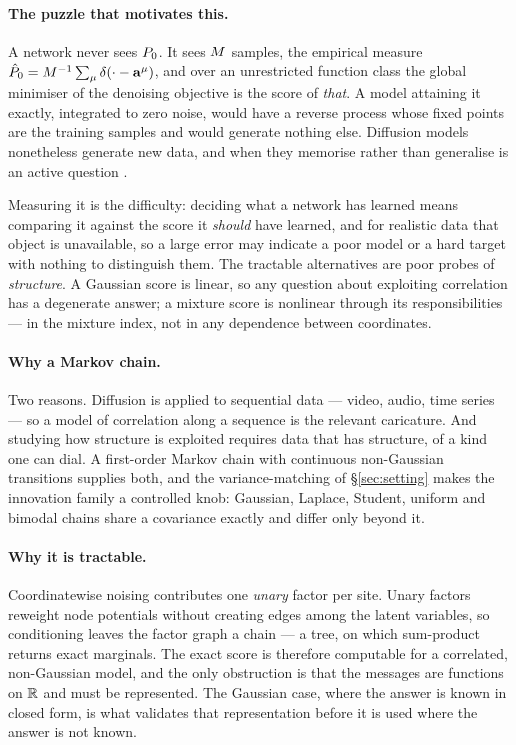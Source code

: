 \documentclass{article}
\theoremstyle{definition}
\theoremstyle{plain}
\begin{document}
\paragraph{The puzzle that motivates this.} A network never sees $P_0$. It sees $M$ samples,
the empirical measure $\hat P_0 = M^{-1}\sum_\mu \delta(\cdot - \mathbf{a}^\mu)$, and over an
unrestricted function class the global minimiser of the denoising objective is the score of
\emph{that}. A model attaining it exactly, integrated to zero noise, would have a reverse process
whose fixed points are the training samples and would generate nothing else. Diffusion models
nonetheless generate new data, and when they memorise rather than generalise is an active question
\citep{biroli2023generative,biroli2024dynamical}.

Measuring it is the difficulty: deciding what a network has learned means comparing it against the
score it \emph{should} have learned, and for realistic data that object is unavailable, so a large
error may indicate a poor model or a hard target with nothing to distinguish them. The tractable
alternatives are poor probes of \emph{structure}. A Gaussian score is linear, so any question about
exploiting correlation has a degenerate answer; a mixture score is nonlinear through its
responsibilities --- in the mixture index, not in any dependence between coordinates.

\paragraph{Why a Markov chain.} Two reasons. Diffusion is applied to sequential data --- video,
audio, time series --- so a model of correlation along a sequence is the relevant caricature. And
studying how structure is exploited requires data that has structure, of a kind one can dial. A
first-order Markov chain with continuous non-Gaussian transitions supplies both, and the
variance-matching of \S\ref{sec:setting} makes the innovation family a controlled knob: Gaussian,
Laplace, Student, uniform and bimodal chains share a covariance exactly and differ only beyond it.

\paragraph{Why it is tractable.} Coordinatewise noising contributes one \emph{unary} factor per
site. Unary factors reweight node potentials without creating edges among the latent variables, so
conditioning leaves the factor graph a chain --- a tree, on which sum-product returns exact
marginals. The exact score is therefore computable for a correlated, non-Gaussian model, and the
only obstruction is that the messages are functions on $\mathbb{R}$ and must be represented. The
Gaussian case, where the answer is known in closed form, is what validates that representation
before it is used where the answer is not known.
\end{document}
